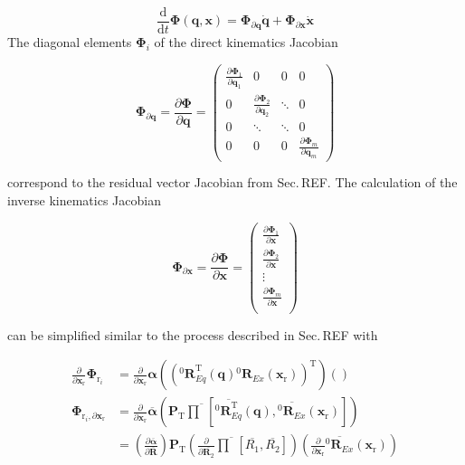 \documentclass[twocolumn,10pt]{IFTOMM}
\newcommand{\bm}[1]{\boldsymbol{#1}}
\newcommand{\rotmat}[2]{{{ }^{#1}\boldsymbol{R}}_{#2}}
\newcommand{\transp}[0]{{\mathrm{T}}}
\begin{document}
\begin{equation}
\frac{\mathrm{d}}{\mathrm{d}t} \bm{\Phi}(\bm{q},\bm{x})
=
\bm{\Phi}_{\partial \bm{q}}  \dot{\bm{q}}
+
\bm{\Phi}_{\partial \bm{x}} \dot{\bm{x}}
\end{equation}
%
The diagonal elements $\bm{\Phi}_i$ of the direct kinematics Jacobian %

\begin{equation}
\bm{\Phi}_{\partial \bm{q}}
=
\frac{\partial \bm{\Phi}}{\partial \bm{q}}
=
\begin{pmatrix}
\frac{\partial \bm{\Phi}_1}{\partial \bm{q}_1}  & 0 & 0 & 0\\
0 & \frac{\partial \bm{\Phi}_2}{\partial \bm{q}_2} & \ddots & 0  \\
0 & \ddots & \ddots & 0  \\
0 & 0 & 0 &\frac{\partial \bm{\Phi}_m}{\partial \bm{q}_m}
\end{pmatrix}
\end{equation}  

correspond to the residual vector Jacobian from Sec.\,REF.
The calculation of the inverse kinematics Jacobian

\begin{equation}
\bm{\Phi}_{\partial \bm{x}}
=
\frac{\partial \bm{\Phi}}{\partial \bm{x}}
=
\begin{pmatrix}
\frac{\partial \bm{\Phi}_1}{\partial \bm{x}}\\
\frac{\partial \bm{\Phi}_2}{\partial \bm{x}}\\
\vdots \\
\frac{\partial \bm{\Phi}_m}{\partial \bm{x}}\\
\end{pmatrix}
\end{equation}  

can be simplified similar to the process described in Sec.\,REF with

\begin{align}
\frac{\partial}{\partial \bm{x}_{\mathrm{r}}}\bm{\Phi}_{\mathrm{r}_i}
&=
\frac{\partial}{\partial \bm{x}_{\mathrm{r}}} \bm{\alpha}\left((\rotmat{0}{Eq}^\transp(\bm{q}) \rotmat{0}{Ex}(\bm{x}_{\mathrm{r}}))^\transp\right) (\label{equ:grad_Phi_x}) \\
\bm{\Phi}_{\mathrm{r}_i,\partial \bm{x}_{\mathrm{r}}} 
&=
\frac{\partial}{\partial \bm{x}_{\mathrm{r}}} \overline{\bm{\alpha}}\left(
\bm{P}_{\mathrm{T}}
\overline{\prod}\left[ \overline{\rotmat{0}{Eq}^\transp}(\bm{q}), \overline{\rotmat{0}{Ex}}(\bm{x}_{\mathrm{r}})\right]\right) \nonumber \\
&=
\left(\frac{\partial \overline{\bm{\alpha}}}{\partial \overline{\bm{R}}}\right)
\bm{P}_{\mathrm{T}}
\left(\frac{\partial }{\partial \overline{\bm{R}_2}}
\overline{\prod}\left[ \overline{R_1}, \overline{R_2}\right]\right)
\left(\frac{\partial}{\partial \bm{x}_{\mathrm{r}}} \overline{\rotmat{0}{Ex}}(\bm{x}_{\mathrm{r}})\right) \nonumber
\end{align}
\end{document}
